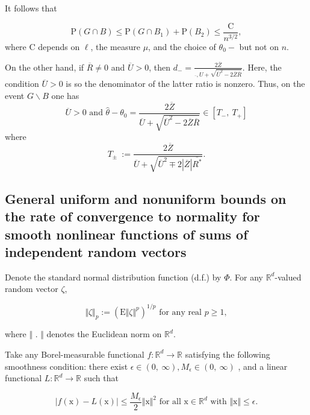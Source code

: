 It follows that 

\begin{equation}\label{GandB}
	\mathrm{P}(G\cap B)\leq \mathrm{P}(G\cap B_{1})+\mathrm{P}(B_{2})\leq\frac{\mathrm{C}}{n^{3/2}}, 
\end{equation}
where $\mathrm{C}$ depends on $\ell$, the measure $\mu$, and the choice of $\theta_{0}-$ but not on $n.$


On the other hand, if $\overline{R}\neq 0$ and $\overline{U}>0$, then $d_{-}=\displaystyle \frac{2\overline{Z}}{\overline{},U+\sqrt{\overline{U}^{2}-2\overline{Z}\overline{R}}}$. Here, the condition $\overline{U}>0$ is so the denominator of the latter ratio is nonzero. Thus, on the event $G\backslash B$ one has
\begin{equation}\label{inclusionrelation}
	\overline{U}>0 \textrm{ and } \displaystyle \hat{\theta}-\theta_{0}=\frac{2\overline{Z}}{\overline{U}+\sqrt{\overline{U}^{2}-2\overline{Z}\overline{R}}}\in[T_{-},\ T_{+}]
\end{equation}
where
\begin{equation}\label{Tpm}
	T_{\pm}\ :=\frac{2\overline{Z}}{\overline{U}+\sqrt{\overline{U}^{2}\mp 2|\overline{Z}|\overline{R^{*}}}
	}.
\end{equation}

\medskip

\subsection*{General uniform and nonuniform bounds on the rate of convergence to normality for smooth nonlinear functions of sums of independent random vectors}

Denote the standard normal distribution function (d.f.) by $\Phi$. For any $\mathbb{R}^{d}$-valued random vector $\zeta$,

\[
\Vert\zeta\Vert_{p} :=(\mathrm{E}\Vert\zeta\Vert^{p})^{1/p} \textrm{ for any real } p\geq 1,
\]

where $\Vert$ . $\Vert$ denotes the Euclidean norm on $\mathbb{R}^{d}.$

Take any Borel-measurable functional $f:\mathbb{R}^{d}\rightarrow \mathbb{R}$ satisfying the following smoothness condition: there exist $\epsilon\in(0,\ \infty), M_{\epsilon}\in(0,\ \infty)$ , and a linear functional $L:\mathbb{R}^{d}\rightarrow \mathbb{R}$ such that

\begin{theorem}
	\begin{equation}\label{eqn:smoothness}
	|f(\displaystyle \mathrm{x})-L(\mathrm{x})|\leq\frac{M_{\epsilon}}{2}\Vert \mathrm{x}\Vert^{2} \textrm{ for all } \mathrm{x}\in \mathbb{R}^{d} \textrm{ with } \Vert \mathrm{x}\Vert\leq\epsilon .
	\end{equation}
	
\end{theorem}

